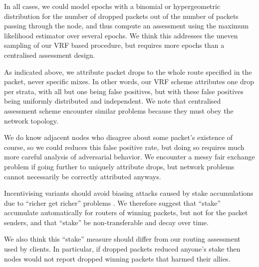 ﻿\documentclass{sig-alternate-hotpets}
\begin{document}
In all cases, we could model epochs with a binomial or hypergeometric
distribution for the number of dropped packets out of the number of
packets passing through the node, and thus compute an assessment
using the maximum likelihood estimator over several epochs.
We think this addresses the uneven sampling of our VRF based procedure,
but requires more epochs than a centralised assessment design.

As indicated above, we attribute packet drops to the whole route
specified in the packet, never specific mixes.  In other words, our
VRF scheme attributes one drop per strata, with all but one being false
positives, but with these false positives being uniformly distributed
and independent.  We note that centralised assessment scheme encounter
similar problems because they must obey the network topology.

We do know adjacent nodes who disagree about some packet's existence
of course, so we could reduces this false positive rate, but doing so
requires much more careful analysis of adversarial behavior.
We encounter a messy fair exchange problem if going further to uniquely
attribute drops, but network problems cannot necessarily be correctly
attributed anyways.

\smallskip

Incentivising variants should avoid biasing attacks caused by
stake accumulations due to ``richer get richer'' problems \cite{CompoundingPoS}.
We therefore suggest that ``stake'' accumulate automatically for
routers of winning packets, but not for the packet senders, and that
``stake'' be non-transferable and decay over time. 

We also think this ``stake'' measure should differ from our routing
assessment used by clients.  In particular, if dropped packets reduced
anyone's stake then nodes would not report dropped winning packets
that harmed their allies. 





\end{document}
